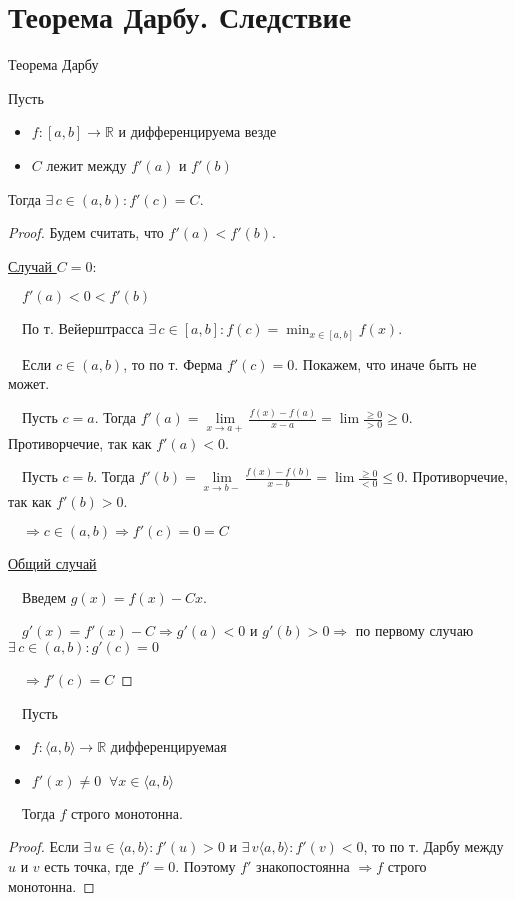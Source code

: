 \section{Теорема Дарбу. Следствие \href{https://youtu.be/OXDjegAsmSU?t=7706}{\Walley}}
\begin{theorem-non}
    Теорема Дарбу

    Пусть 
    \begin{itemize}
        \item $f: [a, b] \to \mathbb{R}$ и дифференцируема везде
        \item $C$ лежит между $f'(a)$ и $f'(b)$
    \end{itemize}
    Тогда $\exists \, c \in (a, b) : f'(c) = C$.
\end{theorem-non}
\begin{proof}
    Будем считать, что $f'(a) < f'(b)$.

    \underline{Случай $C = 0$}:

    $\quad f'(a) < 0 < f'(b)$

    $\quad$По т. Вейерштрасса $\exists \, c \in [a, b] : f(c) = \min_{x \in [a, b]} f(x)$. 
    
    $\quad$Если $c \in (a, b)$, то по т. Ферма $f'(c) = 0$. Покажем, что иначе быть не может.

    $\quad$Пусть $c = a$. Тогда $f'(a) = \lim\limits_{x \to a+} \frac{f(x) - f(a)}{x - a} = \lim \frac{\geqslant 0}{> 0} \geqslant 0$. Противорчечие, так как $f'(a) < 0$.

    $\quad$Пусть $c = b$. Тогда $f'(b) = \lim\limits_{x \to b-} \frac{f(x) - f(b)}{x - b} = \lim \frac{\geqslant 0}{< 0} \leqslant 0$. Противорчечие, так как $f'(b) > 0$.

    $\quad \Rightarrow c \in (a, b) \Rightarrow f'(c) = 0 = C$
    
    \underline{Общий случай}

    $\quad$Введем $g(x) = f(x) - Cx$. 

    $\quad g'(x) = f'(x) - C \Rightarrow g'(a) < 0$ и $g'(b) > 0 \Rightarrow$ по первому случаю $\exists \, c \in (a, b) : g'(c) = 0$
    
    $\quad \Rightarrow f'(c) = C$
\end{proof}
\begin{follow} 

    $\quad$Пусть
    \begin{itemize}
        \item $f: \langle a, b \rangle \to \mathbb{R}$ дифференцируемая
        \item $f'(x) \neq 0 \;\; \forall x \in \langle a, b \rangle$
    \end{itemize}    
    $\quad$Тогда $f$ строго монотонна.
\end{follow}
\begin{proof}
    Если $\exists \, u \in \langle a, b \rangle : f'(u) > 0$ и $\exists \, v \langle a, b \rangle : f'(v) < 0$, то по т. Дарбу между $u$ и $v$ есть точка, где $f' = 0$. Поэтому $f'$ знакопостоянна $\Rightarrow f$ строго монотонна. 
\end{proof}